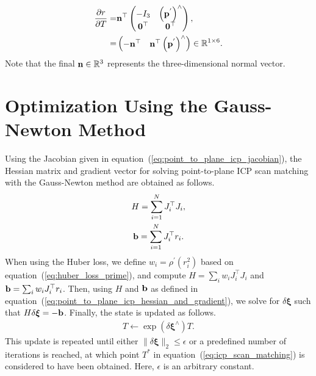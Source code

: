 \begin{align}
  \begin{split}
    \frac{ \partial r }{ \partial T } = & {\bf n}^{\top} \left( \begin{matrix} -I_{3} & \left( {\bf p}^{'} \right)^{\wedge} \\ {\bf 0}^{\top} & {\bf 0}^{\top} \end{matrix} \right), \\
    = & \left( \begin{matrix} -{\bf n}^{\top} & {\bf n}^{\top} \left( {\bf p}^{'} \right)^{\wedge} \end{matrix} \right) \in \mathbb{R}^{1 \times 6}.
  \end{split}
  \label{eq:point_to_plane_icp_jacobian}
\end{align}
%
Note that the final ${\bf n} \in \mathbb{R}^{3}$ represents the three-dimensional normal vector.













\section{Optimization Using the Gauss-Newton Method}

Using the Jacobian given in equation~(\ref{eq:point_to_plane_icp_jacobian}), the Hessian matrix and gradient vector for solving point-to-plane ICP scan matching with the Gauss-Newton method are obtained as follows.
%
\begin{align}
  \begin{gathered}
    H = \sum_{i=1}^{N} J_{i}^{\top} J_{i}, \\
    {\bf b} = \sum_{i=1}^{N} J_{i}^{\top} r_{i}. 
  \end{gathered}
  \label{eq:point_to_plane_icp_hessian_and_gradient}
\end{align}
%
When using the Huber loss, we define $w_{i} = \rho^{\prime}\left( r_{i}^{2} \right)$ based on equation~(\ref{eq:huber_loss_prime}), and compute $H = \sum_{i} w_{i} J_{i}^{\top} J_{i}$ and ${\bf b} = \sum_{i} w_{i} J_{i}^{\top} r_{i}$.
Then, using $H$ and ${\bf b}$ as defined in equation~(\ref{eq:point_to_plane_icp_hessian_and_gradient}), we solve for $\delta \boldsymbol{\xi}$ such that $H \delta \boldsymbol{\xi} = -{\bf b}$.
Finally, the state is updated as follows.
%
\begin{align}
  T \leftarrow \exp \left( \delta \boldsymbol \xi^{\wedge} \right) T.
\end{align}
%
This update is repeated until either $\| \delta \boldsymbol{\xi} \|_{2} \leq \epsilon$ or a predefined number of iterations is reached, at which point $T^{*}$ in equation~(\ref{eq:icp_scan_matching}) is considered to have been obtained.
Here, $\epsilon$ is an arbitrary constant.












